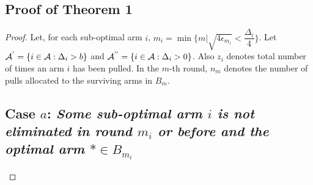 \subsection*{Proof of Theorem 1}
\label{sec:proofTheorem:Theorem1}
\begin{proof}
Let, for each sub-optimal arm ${i}$, $m_{i}=\min{\lbrace m|\sqrt{4\epsilon_{m_i}} < \dfrac{\Delta_{i}}{4} \rbrace}$. Let $\mathcal{A}^{'}=\lbrace i\in \mathcal{A}: \Delta_{i} > b \rbrace$ and $\mathcal{A}^{''}=\lbrace i\in \mathcal{A}: \Delta_{i} > 0 \rbrace$. Also $z_{i}$ denotes total number of times an arm $i$ has been pulled. In the $m$-th round, $n_{m}$ denotes the number of pulls allocated to the surviving arms in $B_{m}$. \\
\subsection*{Case $a$: \textit{Some sub-optimal arm ${i}$ is not eliminated in round $m_{i}$ or before and the optimal arm ${*}\in B_{m_{i}}$}}


\end{proof}
